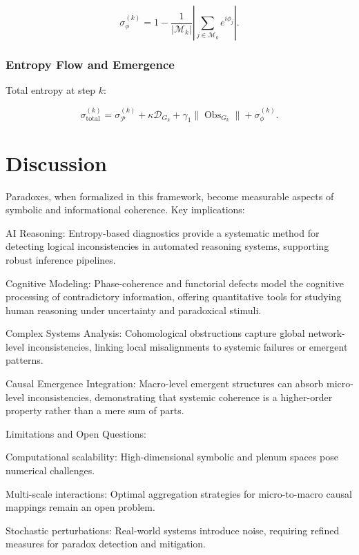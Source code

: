 \documentclass[12pt]{article}
\theoremstyle{plain}
\begin{document}
\begin{equation}
\sigma_\phi^{(k)} = 1 - \frac{1}{|\mathcal{M}_k|} \left|\sum_{j \in \mathcal{M}_k} e^{i\phi_j}\right|.
\end{equation}

\subsubsection{Entropy Flow and Emergence}

Total entropy at step \(k\):

\begin{equation}
\sigma_{\mathrm{total}}^{(k)} = \sigma_\mathcal{P}^{(k)} + \kappa \mathcal{D}_{G_k} + \gamma_1 \|\operatorname{Obs}_{G_k}\| + \sigma_\phi^{(k)}.
\end{equation}

\section{Discussion}

Paradoxes, when formalized in this framework, become measurable aspects of symbolic and informational coherence. Key implications:

AI Reasoning: Entropy-based diagnostics provide a systematic method for detecting logical inconsistencies in automated reasoning systems, supporting robust inference pipelines.

Cognitive Modeling: Phase-coherence and functorial defects model the cognitive processing of contradictory information, offering quantitative tools for studying human reasoning under uncertainty and paradoxical stimuli.

Complex Systems Analysis: Cohomological obstructions capture global network-level inconsistencies, linking local misalignments to systemic failures or emergent patterns.

Causal Emergence Integration: Macro-level emergent structures can absorb micro-level inconsistencies, demonstrating that systemic coherence is a higher-order property rather than a mere sum of parts.

Limitations and Open Questions:

Computational scalability: High-dimensional symbolic and plenum spaces pose numerical challenges.

Multi-scale interactions: Optimal aggregation strategies for micro-to-macro causal mappings remain an open problem.

Stochastic perturbations: Real-world systems introduce noise, requiring refined measures for paradox detection and mitigation.
\end{document}
